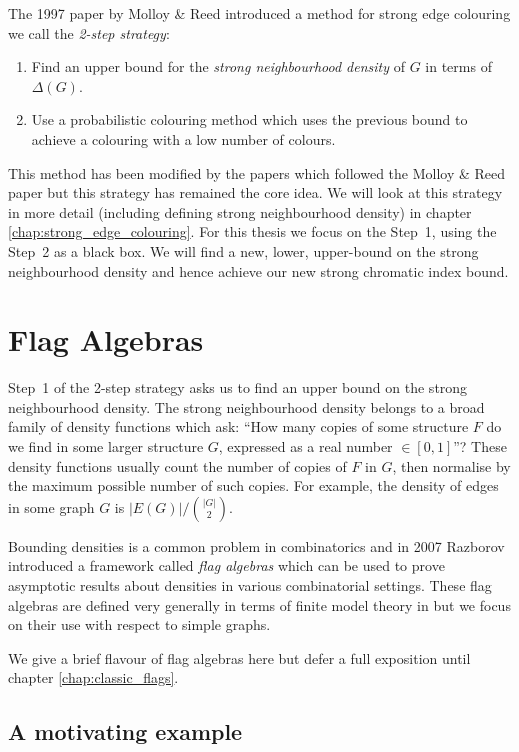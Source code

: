 The 1997 paper by Molloy \& Reed introduced a method for strong edge colouring we call the
\textit{2-step strategy}:
\begin{enumerate}
    \item Find an upper bound for the \textit{strong neighbourhood density} of $G$ in terms of
        $\Delta(G)$.
    \item Use a probabilistic colouring method which uses the previous bound to achieve a colouring
        with a low number of colours.
\end{enumerate}
This method has been modified by the papers which followed the Molloy \& Reed paper but this
strategy has remained the core idea. We will look at this strategy in more detail (including
defining strong neighbourhood density) in chapter \ref{chap:strong_edge_colouring}.
For this thesis we focus on the Step~1, using the Step~2 as a black box. We will
find a new, lower, upper-bound on the strong neighbourhood density and hence achieve our
new strong chromatic index bound.

\section*{Flag Algebras}

Step~1 of the 2-step strategy
asks us to find an upper bound on the strong neighbourhood density. The strong neighbourhood
density belongs to a broad family of density functions which ask: ``How many copies of some
structure $F$ do we find in some larger structure $G$, expressed as a real number $\in [0,1]$''?
These density functions usually count the number of copies of $F$ in $G$, then normalise by the
maximum possible number of such copies.
For example, the density of edges in some graph $G$ is $|E(G)|/\binom{|G|}{2}$.

Bounding densities
is a common problem in combinatorics and in 2007 Razborov \cite{razborovFlagAlgebras2007}
introduced a framework called \textit{flag algebras}
which can be used to prove asymptotic results about densities in various combinatorial settings.
These flag algebras are defined very generally in terms of finite model theory in \cite{razborovFlagAlgebras2007} but we focus on their use with respect to simple graphs.

We give a brief flavour of flag algebras here but defer a full exposition until
chapter \ref{chap:classic_flags}.

\subsection*{A motivating example}
\label{sec:motivating_example}


